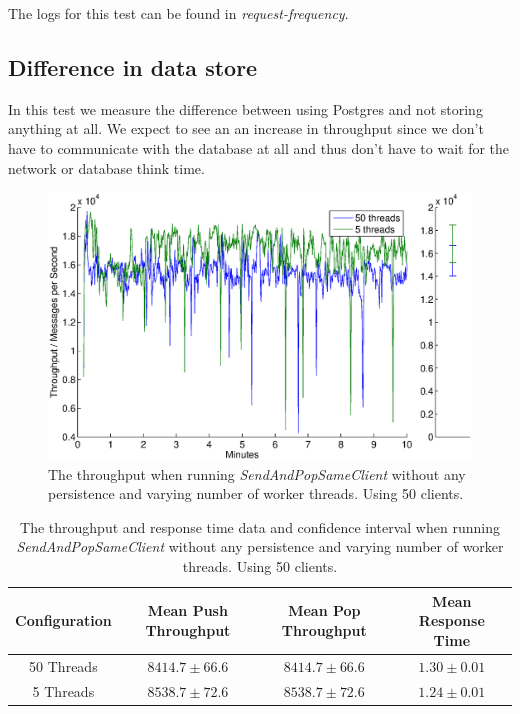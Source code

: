 \documentclass{article}
\begin{document}
        The logs for this test can be found in \textit{request-frequency}.

        \subsection{Difference in data store}
            In this test we measure the difference between using Postgres and not storing anything at all. We expect to see an an increase in throughput since we don't have to communicate with the database at all and thus don't have to wait for the network or database think time.
            
            \begin{figure}[H]
                \hspace{-1.5cm}
                \centerline{\includegraphics[scale=0.40]{throughput_i-fooled-you_50-5-threads-50-clients-1kB-msg}}
                \caption{The throughput when running \textit{SendAndPopSameClient} without any persistence and varying number of worker threads. Using 50 clients.}
                \label{fig:throughput_i-fooled-you_50-5-threads-50-clients-1kB-msg.eps}
                \end{figure}
            
            \begin{table}
            \begin{tabular}{|c|c|c|c|}
            \hline 
            Configuration & Mean Push Throughput & Mean Pop Throughput & Mean Response Time \\ 
            \hline 
            50 Threads & $8414.7 \pm 66.6$ & $8414.7 \pm 66.6$ & $1.30 \pm 0.01$ \\ 
            \hline 
            5 Threads & $8538.7 \pm 72.6$ & $8538.7 \pm 72.6$ & $1.24 \pm 0.01$ \\ 
            \hline 
            \end{tabular} 
                \caption{The throughput and response time data and confidence interval when running \textit{SendAndPopSameClient} without any persistence and varying number of worker threads. Using 50 clients.}
                \label{tbl:throughput_i-fooled-you_50-5-threads-50-clients-1kB-msg.eps}
            \end{table}
\end{document}
